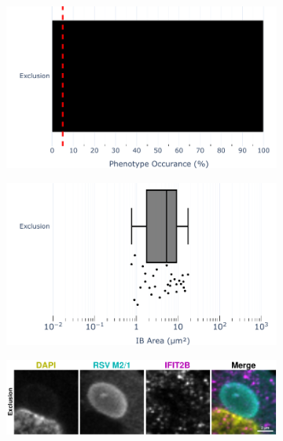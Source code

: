\begin{figure}
    \begin{subfigure}{0.5\textwidth}
        \caption{}
        \includegraphics[width=1\linewidth]{10. Chapter 5/Figs/01. Infection/02. IFIT2B/07. bar_i2b_a549-m21.pdf} 
    \end{subfigure}
    \begin{subfigure}{0.5\textwidth}
        \caption{}
        \includegraphics[width=1\linewidth]{10. Chapter 5/Figs/01. Infection/02. IFIT2B/08. box_i2b_a549-m21.pdf}
    \end{subfigure}
    \begin{subfigure}{1\textwidth}
        \caption{}
        \includegraphics[width=1\linewidth]{10. Chapter 5/Figs/01. Infection/02. IFIT2B/09. i2b a549 hrsv m21.pdf} 

\end{subfigure}
\end{figure}
